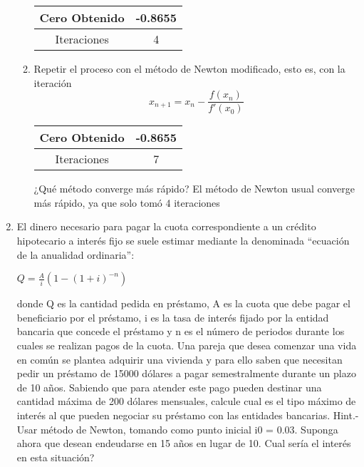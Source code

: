 \documentclass{udparticle}
\begin{document}
\begin{enumerate}
\begin{enumerate}
\begin{table}[H]
\begin{tabular} { |c|c|}
        \hline
        Cero Obtenido &  -0.8655\\
        \hline
        Iteraciones   &    4\\
        \hline
        
        \end{tabular}
        \end{table}
        
        \item Repetir el proceso con el método de Newton modificado, esto es, con la iteración $$x_{n+1} = x_{n} - \frac {f(x_{n})} {f'(x_{0})} $$
        \begin{table}[H]
        \centering
        \begin{tabular} { |c|c|}
        
        \hline
        Cero Obtenido &  -0.8655\\
        \hline
        Iteraciones   &    7\\
        \hline
        
        \end{tabular}
        \end{table}
        ¿Qué método converge más rápido?
        El método de Newton usual converge más rápido, ya que solo tomó 4 iteraciones %
    \end{enumerate}

\item El dinero necesario para pagar la cuota correspondiente a un crédito hipotecario a interés fijo se suele
estimar mediante la denominada “ecuación de la anualidad ordinaria”:
\begin{center}
    $ Q = \frac{A}{i}(1-(1+i)^{-n}) $
\end{center}
donde Q es la cantidad pedida en préstamo, A es la cuota que debe pagar el beneficiario por el
préstamo, i es la tasa de interés fijado por la entidad bancaria que concede el préstamo y n es el
número de periodos durante los cuales se realizan pagos de la cuota.
Una pareja que desea comenzar una vida en común se plantea adquirir una vivienda y para ello saben
que necesitan pedir un préstamo de 15000 dólares a pagar semestralmente durante un plazo de 10 años.
Sabiendo que para atender este pago pueden destinar una cantidad máxima de 200 dólares mensuales,
calcule cual es el tipo máximo de interés al que pueden negociar su préstamo con las entidades bancarias.
Hint.- Usar método de Newton, tomando como punto inicial i0 = 0.03.
Suponga ahora que desean endeudarse en 15 años en lugar de 10. Cual sería el interés en esta situación?



\end{enumerate}
\end{document}
